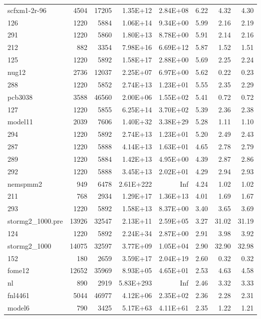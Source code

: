 \documentclass[10pt]{article}
\begin{document}
\begin{longtable}{|l|r|r|r|r|r|r|r|}
scfxm1-2r-96	&	4504	&	17205	&	1.35E+12	&	2.84E+08	&	6.22	&	4.32	&	4.30	\\
126	&	1220	&	5884	&	1.06E+14	&	9.34E+00	&	5.99	&	2.16	&	2.19	\\
291	&	1220	&	5860	&	1.80E+13	&	8.78E+00	&	5.91	&	2.14	&	2.16	\\
212	&	882	&	3354	&	7.98E+16	&	6.69E+12	&	5.87	&	1.52	&	1.51	\\
125	&	1220	&	5892	&	1.58E+17	&	2.88E+00	&	5.69	&	2.25	&	2.24	\\
nug12	&	2736	&	12037	&	2.25E+07	&	6.97E+00	&	5.62	&	0.22	&	0.23	\\
288	&	1220	&	5852	&	2.74E+13	&	1.23E+01	&	5.55	&	2.35	&	2.29	\\
pcb3038	&	3588	&	46560	&	2.00E+06	&	1.55E+02	&	5.41	&	0.72	&	0.72	\\
127	&	1220	&	5855	&	6.25E+14	&	3.70E+02	&	5.39	&	2.36	&	2.38	\\
model11	&	2039	&	7606	&	1.40E+32	&	3.38E+29	&	5.28	&	1.11	&	1.10	\\
294	&	1220	&	5892	&	2.74E+13	&	1.23E+01	&	5.20	&	2.49	&	2.43	\\
287	&	1220	&	5888	&	4.14E+13	&	1.63E+01	&	4.65	&	2.78	&	2.79	\\
289	&	1220	&	5884	&	1.42E+13	&	4.95E+00	&	4.39	&	2.87	&	2.86	\\
292	&	1220	&	5888	&	3.45E+13	&	2.02E+01	&	4.29	&	2.94	&	2.93	\\
nemspmm2	&	949	&	6478	&	2.61E+222	&	Inf	&	4.24	&	1.02	&	1.02	\\
211	&	768	&	2934	&	1.29E+17	&	1.36E+13	&	4.01	&	1.69	&	1.67	\\
293	&	1220	&	5892	&	1.58E+13	&	8.37E+00	&	3.40	&	3.65	&	3.69	\\
stormg2\_1000.pre	&	13926	&	32547	&	2.13E+11	&	2.59E+05	&	3.27	&	31.02	&	31.19	\\
124	&	1220	&	5892	&	2.24E+34	&	2.87E+00	&	2.91	&	3.98	&	3.92	\\
stormg2\_1000	&	14075	&	32597	&	3.77E+09	&	1.05E+04	&	2.90	&	32.90	&	32.98	\\
152	&	180	&	2659	&	3.59E+17	&	2.04E+19	&	2.60	&	0.32	&	0.32	\\
fome12	&	12652	&	35969	&	8.93E+05	&	4.65E+01	&	2.53	&	4.63	&	4.58	\\
nl	&	890	&	2919	&	5.83E+293	&	Inf	&	2.46	&	3.32	&	3.33	\\
fnl4461	&	5044	&	46977	&	4.12E+06	&	2.35E+02	&	2.36	&	2.28	&	2.31	\\
model6	&	790	&	3425	&	5.17E+63	&	4.11E+61	&	2.35	&	1.22	&	1.21	\\

\end{longtable}
\end{document}
